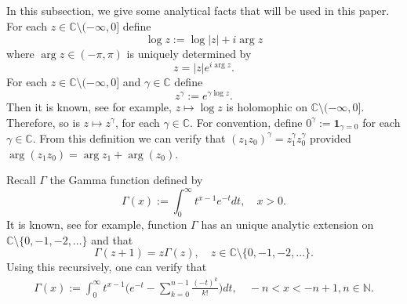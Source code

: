 \documentclass[12pt,oneside,english]{amsart}
\theoremstyle{plain}
\theoremstyle{definition}
\numberwithin{equation}{section}
\begin{document}
\subsection{}
	In this subsection, we give some analytical facts that will be used in this paper.
	For each $z\in \mathbb C\setminus (-\infty,0]$ define
\[
	\log z := \log |z| + i \arg z
\]
	where $\arg z \in (-\pi,\pi)$ is uniquely determined by
\[
	z = |z|e^{i \arg z}.
\] 	
	For each $z\in \mathbb C\setminus (-\infty,0]$ and $\gamma \in \mathbb C$ define
\[
	z^\gamma := e^{\gamma \log z}.
\]
	Then it is known, see \cite[Theorem 6.1]{SteinShakarchi2003Complex} for example, $z\mapsto \log z$ is holomophic on $\mathbb C\setminus (-\infty,0]$.
	Therefore, so is $z\mapsto z^\gamma$, for each $\gamma \in \mathbb C$.
	For convention, define $0^\gamma := \mathbf 1_{\gamma = 0}$ for each $\gamma \in \mathbb C$.
    From this definition we can verify that $(z_1z_0)^\gamma = z_1^\gamma z_0^\gamma$ provided $\arg (z_1z_0)=\arg z_1 + \arg(z_0)$.


    Recall $\Gamma$ the Gamma function defined by
\begin{equation}
    \Gamma (x) := \int_0^\infty t^{x-1} e^{-t}dt,
    \quad x>0.
\end{equation}
	It is known, see \cite[Theorem 6.1.3 and its following remark]{SteinShakarchi2003Complex} for example, function $\Gamma$ has an unique analytic extension on $\mathbb C\setminus\{0, -1,-2,\dots\}$ and that
\[
	\Gamma(z+1) = z \Gamma(z),\quad z\in \mathbb C\setminus\{0, -1,-2,\dots\}.
\]
	Using this recursively, one can verify that
\begin{align}
\label{eq: definition of Gamma function}
    \Gamma(x)
    := \int_0^\infty t^{x-1} \Big(e^{-t} - \sum_{k=0}^{n-1} \frac{(-t)^k}{k!}\Big) dt,
    \quad -n< x< -n+1, n\in \mathbb N.
\end{align}
\end{document}
